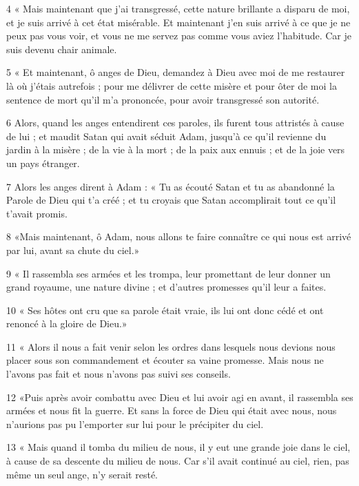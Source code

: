 \par 4 « Mais maintenant que j'ai transgressé, cette nature brillante a disparu de moi, et je suis arrivé à cet état misérable. Et maintenant j’en suis arrivé à ce que je ne peux pas vous voir, et vous ne me servez pas comme vous aviez l’habitude. Car je suis devenu chair animale.

\par 5 « Et maintenant, ô anges de Dieu, demandez à Dieu avec moi de me restaurer là où j'étais autrefois ; pour me délivrer de cette misère et pour ôter de moi la sentence de mort qu'il m'a prononcée, pour avoir transgressé son autorité.

\par 6 Alors, quand les anges entendirent ces paroles, ils furent tous attristés à cause de lui ; et maudit Satan qui avait séduit Adam, jusqu'à ce qu'il revienne du jardin à la misère ; de la vie à la mort ; de la paix aux ennuis ; et de la joie vers un pays étranger.

\par 7 Alors les anges dirent à Adam : « Tu as écouté Satan et tu as abandonné la Parole de Dieu qui t'a créé ; et tu croyais que Satan accomplirait tout ce qu'il t'avait promis.

\par 8 «Mais maintenant, ô Adam, nous allons te faire connaître ce qui nous est arrivé par lui, avant sa chute du ciel.»

\par 9 « Il rassembla ses armées et les trompa, leur promettant de leur donner un grand royaume, une nature divine ; et d'autres promesses qu'il leur a faites.

\par 10 « Ses hôtes ont cru que sa parole était vraie, ils lui ont donc cédé et ont renoncé à la gloire de Dieu.»

\par 11 « Alors il nous a fait venir selon les ordres dans lesquels nous devions nous placer sous son commandement et écouter sa vaine promesse. Mais nous ne l’avons pas fait et nous n’avons pas suivi ses conseils.

\par 12 «Puis après avoir combattu avec Dieu et lui avoir agi en avant, il rassembla ses armées et nous fit la guerre. Et sans la force de Dieu qui était avec nous, nous n’aurions pas pu l’emporter sur lui pour le précipiter du ciel.

\par 13 « Mais quand il tomba du milieu de nous, il y eut une grande joie dans le ciel, à cause de sa descente du milieu de nous. Car s’il avait continué au ciel, rien, pas même un seul ange, n’y serait resté.

